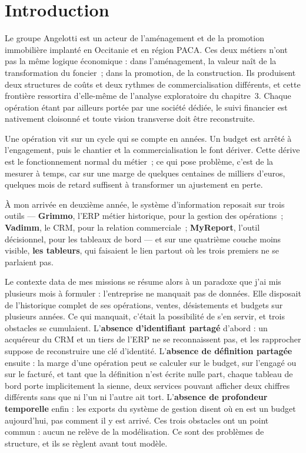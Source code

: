 
\chapter*{Introduction}

Le groupe Angelotti est un acteur de l'aménagement et de la promotion immobilière implanté en
Occitanie et en région PACA. Ces deux métiers n'ont pas la même logique économique : dans
l'aménagement, la valeur naît de la transformation du foncier~; dans la promotion, de la
construction. Ils produisent deux structures de coûts et deux rythmes de commercialisation
différents, et cette frontière ressortira d'elle-même de l'analyse exploratoire du chapitre~3.
Chaque opération étant par ailleurs portée par une société dédiée, le suivi financier est
nativement cloisonné et toute vision transverse doit être reconstruite.

Une opération vit sur un cycle qui se compte en années. Un budget est arrêté à l'engagement,
puis le chantier et la commercialisation le font dériver. Cette dérive est le fonctionnement
normal du métier~; ce qui pose problème, c'est de la mesurer à temps, car sur une marge de
quelques centaines de milliers d'euros, quelques mois de retard suffisent à transformer un
ajustement en perte.

À mon arrivée en deuxième année, le système d'information reposait sur trois outils ---
\textbf{Grimmo}, l'ERP métier historique, pour la gestion des opérations~; \textbf{Vadimm}, le CRM, pour
la relation commerciale~; \textbf{MyReport}, l'outil décisionnel, pour les tableaux de bord --- et sur
une quatrième couche moins visible, \textbf{les tableurs}, qui faisaient le lien partout où les
trois premiers ne se parlaient pas.

Le contexte data de mes missions se résume alors à un paradoxe que j'ai mis plusieurs mois à
formuler : l'entreprise ne manquait pas de données. Elle disposait de l'historique complet de
ses opérations, ventes, désistements et budgets sur plusieurs années. Ce qui manquait, c'était
la possibilité de s'en servir, et trois obstacles se cumulaient. L'\textbf{absence d'identifiant
partagé} d'abord : un acquéreur du CRM et un tiers de l'ERP ne se reconnaissent pas, et les
rapprocher suppose de reconstruire une clé d'identité. L'\textbf{absence de définition partagée}
ensuite : la marge d'une opération peut se calculer sur le budget, sur l'engagé ou sur le
facturé, et tant que la définition n'est écrite nulle part, chaque tableau de bord porte
implicitement la sienne, deux services pouvant afficher deux chiffres différents sans que ni
l'un ni l'autre ait tort. L'\textbf{absence de profondeur temporelle} enfin : les exports du système
de gestion disent où en est un budget aujourd'hui, pas comment il y est arrivé. Ces trois
obstacles ont un point commun : aucun ne relève de la modélisation. Ce sont des problèmes de
structure, et ils se règlent avant tout modèle.

